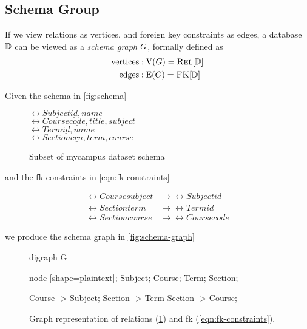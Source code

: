 	\subsection{Schema Group}
		\begin{defn}
		\label{def:schema-graph}
			If we view relations as vertices, and foreign key constraints as edges, a database \(\mathbb{D}\) can be viewed as a \emph{schema graph} \(G{}\), formally defined as
			\begin{align}
				\text{vertices} &: \text{V}(G) = \textsc{Rel}[\mathbb{D}] \\
				\text{edges} &: \text{E}(G) = \textsc{FK}[\mathbb{D}]
			\end{align}
		\end{defn}
		
		\begin{ex}
			Given the schema in \vref{fig:schema}
			
			\begin{figure}[!ht]
				\centering
				
				\(\rel{Subject}{\underline{id}, name}\) \\
				\(\rel{Course}{\underline{code}, title, subject}\) \\
				\(\rel{Term}{\underline{id}, name}\) \\
				\(\rel{Section}{\underline{crn}, term, course}\) \\
				
				\caption{Subset of mycampus dataset schema}
				\label{fig:schema}
			\end{figure}
			
			and the \gls{fk} constraints in \vref{eqn:fk-constraints}
			
			\begin{align}\label{eqn:fk-constraints}
				\rel{Course}{subject} &\rightarrow \rel{Subject}{id} \\
				\rel{Section}{term} &\rightarrow \rel{Term}{id} \\
				\rel{Section}{course} &\rightarrow \rel{Course}{code}
			\end{align}
			
			we produce the schema graph in \vref{fig:schema-graph}
			
			\begin{figure}[!ht]
				\centering
				
				\begin{dot2tex}[dot]
					digraph G {
						node [shape=plaintext]; Subject; Course; Term; Section;
						
						Course -> Subject;
						Section -> Term
						Section -> Course;
					}
				\end{dot2tex}
				
				\caption{Graph representation of relations (\cref{fig:schema}) and \gls{fk} (\cref{eqn:fk-constraints}).}
				\label{fig:schema-graph}
			\end{figure}
		\end{ex}
		
